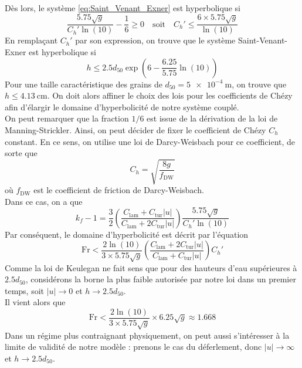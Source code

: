 \documentclass[11pt, a4paper, oneside]{report}
\begin{document}
Dès lors, le système \eqref{eq:Saint_Venant_Exner} est hyperbolique si
\begin{equation}
    \frac{5.75 \sqrt{g}}{C_h' \ln(10)} - \frac{1}{6} \geq 0 \quad \text{soit} \quad C_h' \leq \frac{6 \times 5.75 \sqrt{g}}{\ln(10)}
\end{equation}
En remplaçant $C_h'$ par son expression, on trouve que le système Saint-Venant-Exner est hyperbolique si
\begin{equation}
    h \leq 2.5 d_{50} \exp \left( 6 - \frac{6.25}{5.75} \ln(10) \right)
\end{equation}
Pour une taille caractéristique des grains de $d_{50} = \SI{5e-4}{\meter}$, on trouve que $h \leq \SI{4.13}{\centi\meter}$.
On doit alors affiner le choix des lois pour les coefficients de Chézy afin d'élargir le domaine d'hyperbolicité de notre système couplé. \\
On peut remarquer que la fraction $1/6$ est issue de la dérivation de la loi de Manning-Strickler. Ainsi, on peut décider de fixer le coefficient de Chézy $C_h$ constant. En ce sens, on utilise une loi de Darcy-Weisbach pour ce coefficient, de sorte que
\begin{equation}
    C_h = \sqrt{\frac{8g}{f_\text{DW}}}
\end{equation}
où $f_\text{DW}$ est le coefficient de friction de Darcy-Weisbach. \\
Dans ce cas, on a que
\begin{equation}
    k_f - 1 = \frac{3}{2} \left( \frac{C_\text{lam} + C_\text{tur} \lvert u \rvert}{C_\text{lam} + 2 C_\text{tur} \lvert u \rvert} \right) \frac{5.75 \sqrt{g}}{C_h' \ln(10)}
\end{equation}
Par conséquent, le domaine d'hyperbolicité est décrit par l'équation
\begin{equation}
    \text{Fr} < \frac{2 \ln(10)}{3 \times 5.75 \sqrt{g}} \left( \frac{C_\text{lam} + 2 C_\text{tur} \lvert u \rvert}{C_\text{lam} + C_\text{tur} \lvert u \rvert} \right) C_h'
\end{equation}
Comme la loi de Keulegan ne fait sens que pour des hauteurs d'eau supérieures à $2.5d_{50}$, considérons la borne la plus faible autorisée par notre loi dans un premier temps, soit $\lvert u \rvert \rightarrow 0$ et $h \rightarrow 2.5d_{50}$. \\
Il vient alors que
\begin{equation}
    \text{Fr} < \frac{2 \ln(10)}{3 \times 5.75 \sqrt{g}} \times 6.25 \sqrt{g} \approx 1.668
\end{equation}
Dans un régime plus contraignant physiquement, on peut aussi s'intéresser à la limite de validité de notre modèle : prenons le cas du déferlement, donc $\lvert u \rvert \rightarrow \infty$ et $h \rightarrow 2.5d_{50}$. \\
\end{document}
